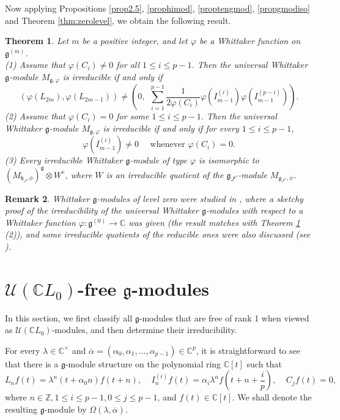 \documentclass[12pt, reqno]{amsart}
\numberwithin{equation}{section}
\newtheorem{theorem}{Theorem}[section]
\newtheorem{remark}[theorem]{Remark}%
\numberwithin{equation}{section}
\def\lmd{\lambda}
\def\al{\alpha}
\def\h{\mathfrak{h}}
\def\g{\mathfrak{g}}
\def\vf{\varphi}
\def\jc{J^C}
\def\gjc{{\g_{\jc}}}
\def\U{\mathcal{U}}
\newcommand{\C}{\mathbb C}
\newcommand{\Z}{\mathbb{Z}}
\newcommand{\ov}[1]{\overline{#1}}
\newcommand{\elei}[2]{I_{#1}^{(#2)}}
\newcommand{\vfi}[2]{\vf\left(I_{#1}^{(#2)}\right)}
\newcommand{\vfl}[1]{\vf(L_{#1})}
\begin{document}
Now applying Propositions \ref{prop2.5}, \ref{prophimod}, \ref{proptengmod}, \ref{propgmodiso} and Theorem \ref{thm:zerolevel}, we obtain the following result.
\begin{theorem}\label{mainthm}
Let $m$ be a positive integer, and let $\varphi$ be a Whittaker function on $\g^{(m)}$. \\
 (1) Assume that $\vf(C_i)\neq 0$ for all $1\leq i\leq p-1$.
 Then the universal Whittaker $\g$-module $M_{\g,\varphi}$ is irreducible if and only if
 $$(\vfl{2m},\vfl{2m-1})\neq \left(0,\ \ \sum_{i=1}^{p-1}\frac1{2\vf(C_i)}\vfi{m-1}i\vfi{m-1}{p-i}\right).$$
 (2) Assume that $\vf(C_i)=0$ for some $1\leq i\leq p-1$. Then the universal Whittaker $\g$-module $M_{\g,\varphi}$ is irreducible if and only if for every $1\le i\le p-1$,
 $$\vfi {m-1}i\neq0\quad \text{ whenever } \vf(C_i)=0.$$
 (3) Every irreducible Whittaker $\g$-module of type $\varphi$
 is isomorphic to  $(M_{\h_J,\phi})^\g\otimes W^e$,
 where $W$ is an irreducible quotient of the $\gjc$-module $M_{\g_{J^C},\psi}$.
\end{theorem}
\begin{remark}
 Whittaker $\g$-modules of level zero were studied in \cite{GX}, where a sketchy proof of the irreducibility of the universal Whittaker $\g$-modules with respect to a Whittaker function $\vf:\g^{(0)}\rightarrow\C$ was given (the result matches with Theorem \ref{mainthm} (2)), and some irreducible quotients of the reducible ones were also discussed (see \cite[Subsection 5.4]{GX}).
\end{remark}


\section{$\U(\C L_0)$-free $\g$-modules}
In this section, we first classify all $\g$-modules that are free of rank 1 when viewed as $\U(\C L_0)$-modules, and then determine their irreducibility.

For every  $\lmd\in\C^\times$ and $\ov\al=(\al_0,\al_1,\dots,\al_{p-1})\in\C^p$, it is straightforward to see that there is a $\g$-module structure on
the polynomial ring $\C[t]$ such that
$$ L_nf(t)=\lmd^n(t+\al_0n)f(t+n),\ \ \ \ \
 \elei nif(t)=\al_i\lmd^nf(t+n+\frac ip),\ \ \ \ \
 C_jf(t)=0, $$
where $n\in\Z, 1\leq i\leq p-1, 0\leq j\leq p-1$, and $f(t)\in\C[t]$.
We shall denote the resulting $\g$-module by $\Omega(\lmd,\ov\al)$.
\end{document}

